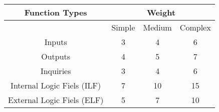 \begin{center}
\begin{tabular}{|c|c|c|c|}
\hline
\multicolumn{1}{|c|}{\textbf{Function Types}} & \multicolumn{3}{c|}{\textbf{Weight}}\\
\hline
\multicolumn{1}{|c|}{} & \multicolumn{1}{|c|}{Simple} &\multicolumn{1}{|c|}{Medium} &\multicolumn{1}{|c|}{Complex}\\
\hline
Inputs 						&3 	&4	&6\\
Outputs 					&4 	&5 	&7\\
Inquiries					&3	&4	&6\\
Internal Logic Fiels (ILF)	&7	&10	&15\\
External Logic Fiels (ELF)	&5	&7	&10\\
\hline
\end{tabular}
\end{center}


